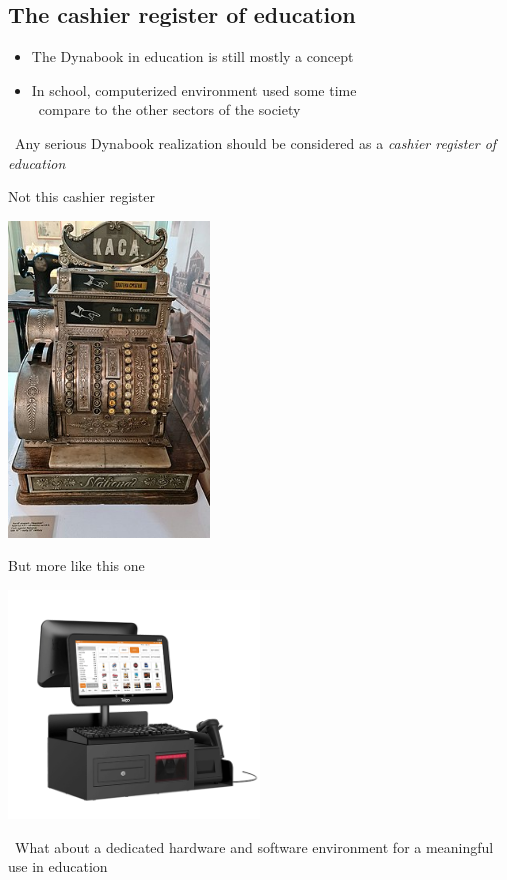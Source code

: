 \documentclass{beamer}
\newcommand{\tip}{\boldmath{\textcolor{red}{$\Rightarrow$}}}
\begin{document}
\subsection{The cashier register of education}
\begin{frame}
  \begin{itemize}
  \item The Dynabook in education is still mostly a concept
  \item In school, computerized environment used some time\\
    \tip\ compare to the other sectors of the society
  \end{itemize}

  \vspace{20pt}
  
  \tip\ Any serious Dynabook realization should be considered as a
  \emph{cashier register of education}
\end{frame}
%
\begin{frame}{Not this cashier register}
  \begin{center}
      \includegraphics[width=0.4\textwidth]{Old_National_Cash_Register.jpg}
    \end{center}
\end{frame}
%
\begin{frame}{But more like this one}
  \begin{center}
    \includegraphics[width=0.5\textwidth]{Telpo-C68-02.png}
  \end{center}
  
  \tip\ What about a dedicated hardware and software environment for a
  meaningful use in education
\end{frame}
\end{document}
